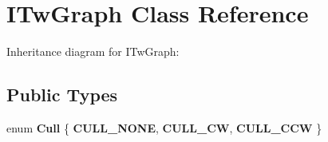 \hypertarget{class_i_tw_graph}{\section{I\+Tw\+Graph Class Reference}
\label{class_i_tw_graph}
}


Inheritance diagram for I\+Tw\+Graph\+:
\subsection*{Public Types}
\begin{DoxyCompactItemize}
\item 
\hypertarget{class_i_tw_graph_ab582f7ae6d2429b51d5327287a207b3f}{enum {\bfseries Cull} \{ {\bfseries C\+U\+L\+L\+\_\+\+N\+O\+N\+E}, 
{\bfseries C\+U\+L\+L\+\_\+\+C\+W}, 
{\bfseries C\+U\+L\+L\+\_\+\+C\+C\+W}
 \}}\label{class_i_tw_graph_ab582f7ae6d2429b51d5327287a207b3f}

\end{DoxyCompactItemize}
